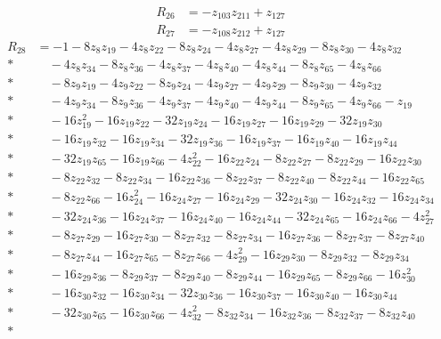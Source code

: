 \documentclass[11pt]{article}
\theoremstyle{remark}
\begin{document}
\begin{align*}
R_{26}&=-z_{103} z_{211}+z_{127}
\end{align*}
\begin{align*}
R_{27}&=-z_{108} z_{212}+z_{127}
\end{align*}
\begin{align*}
R_{28}&=-1-8z_{8} z_{19}-4z_{8} z_{22}-8z_{8} z_{24}-4z_{8} z_{27}-4z_{8} z_{29}-8z_{8} z_{30}-4z_{8} z_{32}\\*
&\quad{}-4z_{8} z_{34}-8z_{8} z_{36}-4z_{8} z_{37}-4z_{8} z_{40}-4z_{8} z_{44}-8z_{8} z_{65}-4z_{8} z_{66}\\*
&\quad{}-8z_{9} z_{19}-4z_{9} z_{22}-8z_{9} z_{24}-4z_{9} z_{27}-4z_{9} z_{29}-8z_{9} z_{30}-4z_{9} z_{32}\\*
&\quad{}-4z_{9} z_{34}-8z_{9} z_{36}-4z_{9} z_{37}-4z_{9} z_{40}-4z_{9} z_{44}-8z_{9} z_{65}-4z_{9} z_{66}-z_{19}\\*
&\quad{}-16z_{19}^{2}-16z_{19} z_{22}-32z_{19} z_{24}-16z_{19} z_{27}-16z_{19} z_{29}-32z_{19} z_{30}\\*
&\quad{}-16z_{19} z_{32}-16z_{19} z_{34}-32z_{19} z_{36}-16z_{19} z_{37}-16z_{19} z_{40}-16z_{19} z_{44}\\*
&\quad{}-32z_{19} z_{65}-16z_{19} z_{66}-4z_{22}^{2}-16z_{22} z_{24}-8z_{22} z_{27}-8z_{22} z_{29}-16z_{22} z_{30}\\*
&\quad{}-8z_{22} z_{32}-8z_{22} z_{34}-16z_{22} z_{36}-8z_{22} z_{37}-8z_{22} z_{40}-8z_{22} z_{44}-16z_{22} z_{65}\\*
&\quad{}-8z_{22} z_{66}-16z_{24}^{2}-16z_{24} z_{27}-16z_{24} z_{29}-32z_{24} z_{30}-16z_{24} z_{32}-16z_{24} z_{34}\\*
&\quad{}-32z_{24} z_{36}-16z_{24} z_{37}-16z_{24} z_{40}-16z_{24} z_{44}-32z_{24} z_{65}-16z_{24} z_{66}-4z_{27}^{2}\\*
&\quad{}-8z_{27} z_{29}-16z_{27} z_{30}-8z_{27} z_{32}-8z_{27} z_{34}-16z_{27} z_{36}-8z_{27} z_{37}-8z_{27} z_{40}\\*
&\quad{}-8z_{27} z_{44}-16z_{27} z_{65}-8z_{27} z_{66}-4z_{29}^{2}-16z_{29} z_{30}-8z_{29} z_{32}-8z_{29} z_{34}\\*
&\quad{}-16z_{29} z_{36}-8z_{29} z_{37}-8z_{29} z_{40}-8z_{29} z_{44}-16z_{29} z_{65}-8z_{29} z_{66}-16z_{30}^{2}\\*
&\quad{}-16z_{30} z_{32}-16z_{30} z_{34}-32z_{30} z_{36}-16z_{30} z_{37}-16z_{30} z_{40}-16z_{30} z_{44}\\*
&\quad{}-32z_{30} z_{65}-16z_{30} z_{66}-4z_{32}^{2}-8z_{32} z_{34}-16z_{32} z_{36}-8z_{32} z_{37}-8z_{32} z_{40}\\*

\end{align*}
\end{document}
